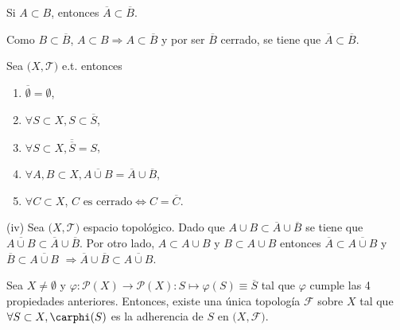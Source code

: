 \begin{lem}
  Si $A \subset B$, entonces $ \overline{A} \subset \overline{B}$.
\end{lem}

\begin{dem}
  Como $B \subset \overline{B}$, $A \subset B \Rightarrow A \subset \overline{B}$ y por ser $\overline{B}$ cerrado, se tiene que $\overline{A} \subset \overline{B}$.
\end{dem}

\begin{prop}
  Sea $\big( X, \mathcal{T} \big)$ e.t. entonces
  \begin{enumerate}[label=(\roman*)]
    \item $\overline{\emptyset} =  \emptyset$,
    \item $\forall S \subset X, S \subset \overline{S}$,
    \item $\forall S \subset X, \overline{\overline{S}} = S$,
    \item $\forall A,B \subset X, \overline{A \cup B} = \overline{A} \cup \overline{B}$,
    \item $\forall C \subset X$, $C \text{ es cerrado} \Leftrightarrow C = \overline{C}$.
  \end{enumerate}
\end{prop}

\begin{dem}(iv)
  Sea $\big( X, \mathcal{T} \big)$ espacio topológico. Dado que $A \cup B \subset \overline{A} \cup \overline{B}$ se tiene que $ \overline{A \cup B} \subset \overline{A} \cup \overline{B}$. Por otro lado, $A \subset A \cup B$ y $B \subset A \cup B$ entonces $\overline{A} \subset \overline{A \cup B}$ y $\overline{B} \subset \overline{A \cup B}$ $\Rightarrow \overline{A} \cup \overline{B} \subset \overline{A \cup B}$.
\end{dem}

\begin{theo}
  Sea $ X \neq \emptyset$ y $ \varphi: \mathcal{P}(X) \to \mathcal{P}(X) : S \mapsto \varphi (S) \equiv \overline{S}$ tal que $\varphi$ cumple las 4 propiedades anteriores. Entonces, existe una única topología $\mathcal{F}$ sobre $X$ tal que $\forall S \subset X, \carphi(S)$ es la adherencia de $S$ en $\big( X, \mathcal{F} \big)$.
\end{theo}

